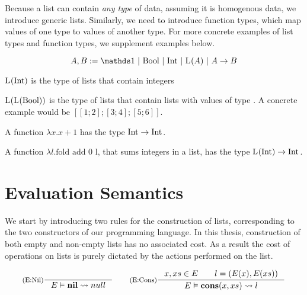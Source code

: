Because a list can contain \emph{any type} of data, assuming it is homogenous data, we introduce generic lists. Similarly, we need to introduce function types, which map values of one type to values of another type. For more concrete examples of list types and function types, we supplement examples below.

\begin{definition}\label{def:type-system-6}
   \[
      A, B := \unit~|~\text{\bool}~|~\text{\typeint}~|~\ralist{}{A}~|~\rafunc{A}{B}{}{}
   \]
\end{definition}

\begin{example}
   \(\text{L}^{}(\text{Int})\) is the type of lists that contain integers
\end{example}

\begin{example}
   \(\text{L}^{}(\text{L}^{}(\text{Bool}))\) is the type of lists that contain lists with values of type \bool. A concrete example would be \([[1;2];[3;4];[5;6]]\).
\end{example}

\begin{example}
   A function \(\lambda x.x+1\) has the type \(\text{Int} \to \text{Int} ^{}_{}\).
\end{example}

\begin{example}
   A function \(\lambda l. \text{fold add  0  l}\), that sums integers in a list, has the type \(\text{L}^{}(\text{Int}) \to \text{Int} ^{}_{}\).
\end{example}



\section{Evaluation Semantics}

We start by introducing two rules for the construction of lists, corresponding to the two constructors of our programming language. In this thesis, construction of both empty and non-empty lists has no associated cost. As a result the cost of operations on lists is purely dictated by the actions performed on the list. 

\[
   \inference[(E:Nil)]
   {}
   {\evals{E}{\listnil}{null}{}{}}
   \qquad
   \inference[(E:Cons)]
   {\contains{E}{x, xs} \qquad l = (E(x), E(xs))}
   {\evals{E}{\cons{x}{xs}}{l}{}{}}
\]

